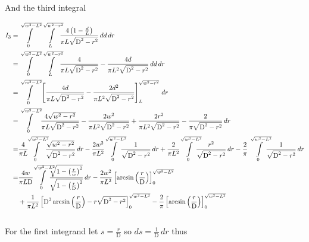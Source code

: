And the third integral

\begin{align*}
I_{3}=&\intop_{0}^{\sqrt{w^2-L^2}}
\intop_{L}^{\sqrt{w^{2}-r^{2}}}\!\!\!
\frac{4 \left(1-\frac{d}{L}\right)}{\pi  L \sqrt{\text{D}^2-r^2}}\,dd\,dr\\
=&\intop_{0}^{\sqrt{w^2-L^2}}
\intop_{L}^{\sqrt{w^{2}-r^{2}}}\!\!\!
\frac{4}{\pi  L \sqrt{\text{D}^2-r^2}} 
-\frac{4 d}{\pi  L^{2} \sqrt{\text{D}^2-r^2}}
\,dd\,dr\\
=&\intop_{0}^{\sqrt{w^2-L^2}}
\left[
\frac{4 d}{\pi  L \sqrt{\text{D}^2-r^2}} 
-\frac{2 d^{2}}{\pi  L^{2} \sqrt{\text{D}^2-r^2}}
\right]_{L}^{\sqrt{w^{2}-r^{2}}}
\,dr\\
=&\intop_{0}^{\sqrt{w^2-L^2}}\!
\frac{4 \sqrt{w^2-r^2}}{\pi  L\sqrt{\text{D}^2-r^2}}
-\frac{2 w^2}{\pi  L^2\sqrt{\text{D}^2-r^2}}
+\frac{2 r^2}{\pi  L^2\sqrt{\text{D}^2-r^2}}
-\frac{2}{\pi  \sqrt{\text{D}^2-r^2}}
\,dr\\
=&
\frac{4}{\pi  L}\!\!\!
\intop_{0}^{\sqrt{w^2-L^2}}\!\!\!
\frac{\sqrt{w^2-r^2}}{\sqrt{\text{D}^2-r^2}}
\,dr
-\frac{2 w^2}{\pi  L^2}\!\!
\intop_{0}^{\sqrt{w^2-L^2}}\!\!\!\!\!
\frac{1}{\sqrt{\text{D}^2-r^2}}
\,dr
+\frac{2}{\pi  L^2}\!\!
\intop_{0}^{\sqrt{w^2-L^2}}\!\!\!\!\!
\frac{r^2}{\sqrt{\text{D}^2-r^2}}
\,dr
-\frac{2}{\pi}
\intop_{0}^{\sqrt{w^2-L^2}}\!\!\!\!\!
\frac{1}{\sqrt{\text{D}^2-r^2}}
\,dr\\
=&
\frac{4 w}{\pi  L \text{D}}\!\!
\intop_{0}^{\sqrt{w^2-L^2}}\!\!\!\!\!
\frac{\sqrt{1-\left(\frac{r}{w}\right)^2}}{\sqrt{1-\left(\frac{r}{\text{D}}\right)^2}}
\,dr
-\frac{2 w^2}{\pi  L^2}\left[
\arcsin\left(\frac{r}{\text{D}}\right)
\right]_{0}^{\sqrt{w^2-L^2}}\\
&+\frac{1}{\pi  L^2}\left[
\text{D}^{2}\arcsin\left(\frac{r}{\text{D}}\right)
-r\sqrt{\text{D}^2-r^2}
\right]_{0}^{\sqrt{w^2-L^2}}
-\frac{2}{\pi}\left[
\arcsin\left(\frac{r}{\text{D}}\right)
\right]_{0}^{\sqrt{w^2-L^2}}
\end{align*}
\\
For the first integrand let $s=\frac{r}{\text{D}}$ so $ds=\frac{1}{\text{D}}\,dr$ thus

